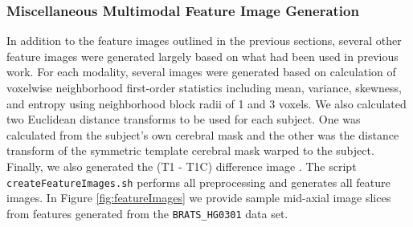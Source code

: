 \documentclass[preprint,authoryear,review,12pt]{elsarticle}
\begin{document}
{\subsubsection{Miscellaneous Multimodal Feature Image Generation}
\label{sec:misc}

In addition to the feature images outlined in the previous sections, 
several other feature images were generated largely based on what 
had been used in previous work.  For each modality, several images
were generated based on calculation of voxelwise neighborhood 
first-order statistics including mean, variance, skewness, and entropy
using neighborhood block radii
of 1 and 3 voxels.  We also calculated two Euclidean distance
transforms \citep{maurer2003} to be used for each subject.  One was
calculated from the subject's own cerebral mask and the other was the 
distance transform of the symmetric template cerebral mask warped
to the subject.  Finally, we also generated the  (T1 - T1C) difference 
image \citep{prastawa2003}.
The script {\tt createFeatureImages.sh} performs all preprocessing
and generates all feature images.  In Figure \ref{fig:featureImages} we provide sample mid-axial 
image slices from features generated from the {\tt BRATS\_HG0301} data set.

}
\end{document}

